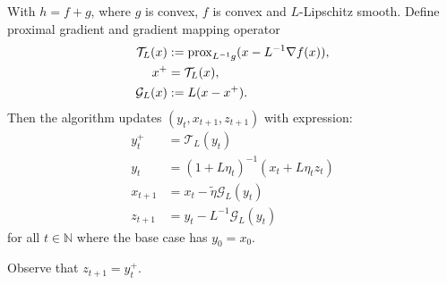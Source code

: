 \documentclass[12pt]{article}
\begin{document}
            \begin{definition}
            \label{def:ag_prox_grad_generic}
                With $h = f + g$, where $g$ is convex, $f$ is convex and $L$-Lipschitz smooth. 
                Define proximal gradient and gradient mapping operator 
                $$
                \begin{aligned}
                    \mathcal T_L(x) 
                    &:= \operatorname{prox}_{L^{-1}g}(x - L^{-1}\nabla f(x)), 
                    \\
                    x^+ &= \mathcal T_L(x), 
                    \\
                    \mathcal G_L(x) 
                    &:= L(x -  x^+). 
                \end{aligned}
                $$
                Then the algorithm updates $(y_t, x_{t + 1}, z_{t + 1})$ with expression: 
                $$
                \begin{aligned}
                    y_t^+ &= \mathcal T_L(y_t)
                    \\
                    y_t &= (1 + L\eta_t)^{-1}(x_t + L\eta_t z_t)
                    \\
                    x_{t + 1} &= x_t - \tilde \eta \mathcal G_L(y_t)
                    \\
                    z_{t + 1} &= y_t - L^{-1}\mathcal G_L(y_t)
                \end{aligned}
                $$
                for all $t\in \mathbb N$ where the base case has $y_0 = x_0$. 
            \end{definition}
            \begin{remark}
                Observe that $z_{t + 1} = y_t^+$. 
            \end{remark}
\end{document}
